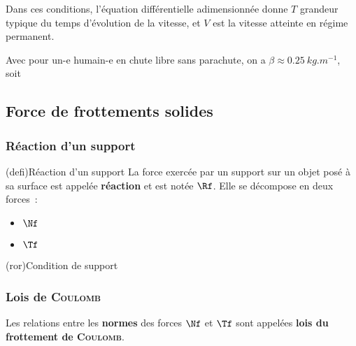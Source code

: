\documentclass[../../main/main.tex]{subfiles}
\begin{document}
Dans ces conditions, l'équation différentielle adimensionnée donne $T$ grandeur
typique du temps d'évolution de la vitesse, et $V$ est la vitesse atteinte en
régime permanent.

Avec pour un-e humain-e en chute libre sans parachute, on a
$\beta \approx \SI{0.25}{kg.m^{-1}}$, soit
\psw{
	\[
		\boxed{v_{\lim} = \SI{60}{m.s^{-1} \approx \SI{200}{km.h^{-1}}}}
		\qet
		\boxed{T \approx \SI{6}{s}}
	\]
}


\subsection{Force de frottements solides}
\subsubsection{Réaction d'un support}

\begin{tcb*}[sidebyside, righthand ratio=.4](defi){Réaction d'un support}
	La force exercée par un support sur un objet posé à sa surface est appelée
	\textbf{réaction} et est notée $\Rf$. Elle se décompose en deux forces~:
	\psw{
		\[
			\Rf = \Nf + \Tf
			\qou
			\Rf = \Rf_N + \Rf_T
		\]
	}
	\vspace{-15pt}
	\begin{itemize}
		\item $\Nf$ 
		\item $\Tf$ 
	\end{itemize}
	\tcblower
	\begin{center}
		\vspace{-15pt}
	\end{center}
\end{tcb*}
\begin{tcb*}(ror){Condition de support}
\end{tcb*}

\subsubsection{Lois de \textsc{Coulomb}}
Les relations entre les \textbf{normes} des forces $\Nf$ et $\Tf$ sont appelées
\textbf{lois du frottement de \textsc{Coulomb}}.
\end{document}
